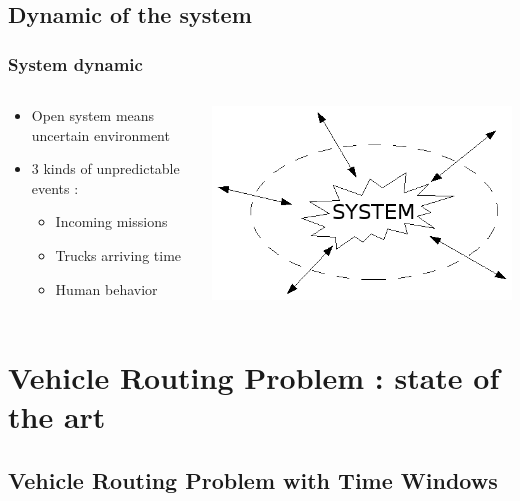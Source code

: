 \documentclass{beamer}
\begin{document}
\subsection*{Dynamic of the system}
\begin{frame}
\frametitle{System dynamic}
	\begin{columns}
		\begin{column}[l]{8cm}
			\begin{itemize}
				\item Open system means uncertain environment
				\item 3 kinds of unpredictable events : 
				\begin{itemize}
 					\item Incoming missions
					\item Trucks arriving time
					\item Human behavior
				\end{itemize}
			\end{itemize}
		\end{column}
		\begin{column}[r]{4cm}
			\begin{center}
				\includegraphics[height=.30\textheight]{fig/openSystem.png}
			\end{center}
	 	\end{column}
	\end{columns}
\end{frame}

\section{Vehicle Routing Problem : state of the art}

\subsection*{Vehicle Routing Problem with Time Windows}
\end{document}
